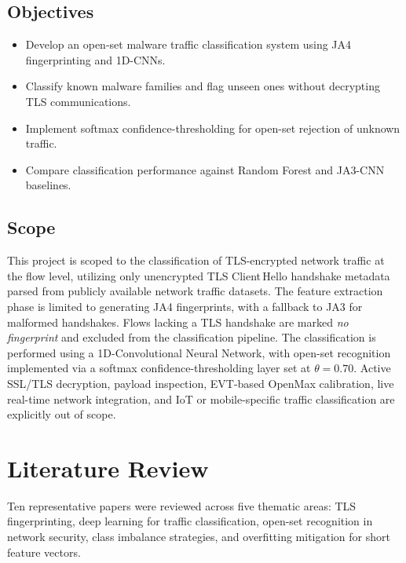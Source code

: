 \documentclass[12pt,a4paper]{report}
\begin{document}
\section{Objectives}

\begin{itemize}[leftmargin=*]
  \item Develop an open-set malware traffic classification system using JA4 fingerprinting and 1D-CNNs.
  \item Classify known malware families and flag unseen ones without decrypting TLS communications.
  \item Implement softmax confidence-thresholding for open-set rejection of unknown traffic.
  \item Compare classification performance against Random Forest and JA3-CNN baselines.
\end{itemize}



\section{Scope}

This project is scoped to the classification of TLS-encrypted network traffic at the flow level, utilizing only unencrypted TLS Client\,Hello handshake metadata parsed from publicly available network traffic datasets. The feature extraction phase is limited to generating JA4 fingerprints, with a fallback to JA3 for malformed handshakes. Flows lacking a TLS handshake are marked \textit{no fingerprint} and excluded from the classification pipeline. The classification is performed using a 1D-Convolutional Neural Network, with open-set recognition implemented via a softmax confidence-thresholding layer set at $\theta = 0.70$. Active SSL/TLS decryption, payload inspection, EVT-based OpenMax calibration, live real-time network integration, and IoT or mobile-specific traffic classification are explicitly out of scope.

\chapter{Literature Review}

Ten representative papers were reviewed across five thematic areas: TLS fingerprinting, deep learning for traffic classification, open-set recognition in network security, class imbalance strategies, and overfitting mitigation for short feature vectors.
\end{document}
